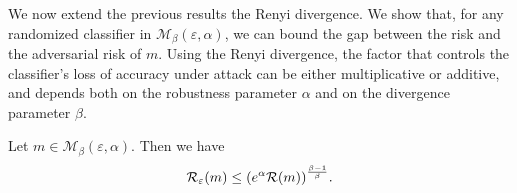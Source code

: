 We now extend the previous results the Renyi divergence. We show that, for any randomized classifier in $\mathcal{M}_{\beta}\left(\varepsilon,\alpha\right)$, we can bound the gap between the risk and the adversarial risk of $m $. Using the Renyi divergence, the factor that controls the classifier’s loss of accuracy under attack can be either multiplicative or additive, and depends both on the robustness parameter $\alpha$ and on the divergence parameter $\beta$.


\begin{thm}
\label{th:multiplicative}
 Let $m  \in \mathcal{M}_{\beta}\left(\varepsilon,\alpha\right)$. Then we have
\begin{equation*}
    \risk_\varepsilon(m ) \leq \left(e^{\alpha} \risk(m )\right)^{\frac{\beta-1}{\beta}}.
\end{equation*}
\end{thm}

